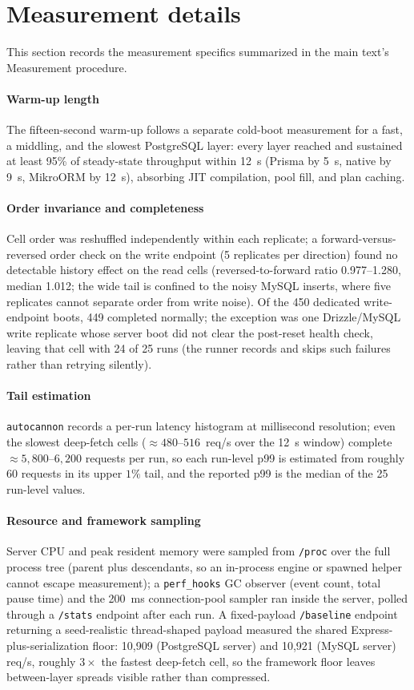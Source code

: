 \documentclass[11pt,a4paper]{article}
\begin{document}
\section{Measurement details}
\label{sup:measure}
This section records the measurement specifics summarized in the main text's Measurement
procedure.

\paragraph{Warm-up length}
The fifteen-second warm-up follows a separate cold-boot measurement for a fast, a middling,
and the slowest PostgreSQL layer: every layer reached and sustained at least 95\% of
steady-state throughput within 12~s (Prisma by 5~s, native by 9~s, MikroORM by 12~s),
absorbing JIT compilation, pool fill, and plan caching.

\paragraph{Order invariance and completeness}
Cell order was reshuffled independently within each replicate; a forward-versus-reversed
order check on the write endpoint (5 replicates per direction) found no detectable history
effect on the read cells (reversed-to-forward ratio 0.977--1.280, median 1.012; the wide
tail is confined to the noisy MySQL inserts, where five replicates cannot separate order
from write noise). Of the 450 dedicated write-endpoint boots, 449 completed normally; the
exception was one Drizzle/MySQL write replicate whose server boot did not clear the
post-reset health check, leaving that cell with 24 of 25 runs (the runner records and skips
such failures rather than retrying silently).

\paragraph{Tail estimation}
\texttt{autocannon} records a per-run latency histogram at millisecond resolution; even the
slowest deep-fetch cells ($\approx480$--$516$~req/s over the 12~s window) complete
$\approx5{,}800$--$6{,}200$ requests per run, so each run-level p99 is estimated from
roughly 60 requests in its upper $1\%$ tail, and the reported p99 is the median of the 25
run-level values.

\paragraph{Resource and framework sampling}
Server CPU and peak resident memory were sampled from \texttt{/proc} over the full process
tree (parent plus descendants, so an in-process engine or spawned helper cannot escape
measurement); a \texttt{perf\_hooks} GC observer (event count, total pause time) and the
200~ms connection-pool sampler ran inside the server, polled through a \texttt{/stats}
endpoint after each run. A fixed-payload \texttt{/baseline} endpoint returning a
seed-realistic thread-shaped payload measured the shared Express-plus-serialization floor:
10{,}909 (PostgreSQL server) and 10{,}921 (MySQL server) req/s, roughly $3\times$ the
fastest deep-fetch cell, so the framework floor leaves between-layer spreads visible rather
than compressed.
\end{document}
